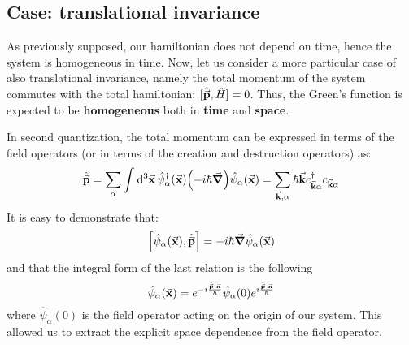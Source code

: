 \documentclass[../main/main.tex]{subfiles}
\begin{document}

\subsection{Case: translational invariance}
As previously supposed, our hamiltonian does not depend on time, hence the system is homogeneous in time.
Now, let us consider a more particular case of also translational invariance,   namely the total momentum of the system commutes with the total hamiltonian: \( [\hat{\va{p}}, \hat{H}  ] = 0 \).
Thus, the Green's function is expected to be \textbf{homogeneous} both in \textbf{time} and \textbf{space}.

In second quantization, the total momentum can be expressed in terms of the field operators (or in terms of the creation and destruction operators) as:
\begin{equation*}
  \hat{\va{p}} = \sum_{\alpha }^{} \int_{}^{} \dd[3]{\va{x}}
  \hat{\psi }_ \alpha ^\dag (\va{x}) \qty(- i \hbar \va{\grad }) \hat{\psi }_ \alpha (\va{x})
  = \sum_{\va{k}, \alpha }^{} \hbar \va{k} c_{\va{k} \alpha } ^\dag c_{\va{k} \alpha }
\end{equation*}
It is easy to demonstrate that:
\begin{equation*}
  \qty[ \hat{\psi }_ \alpha (\va{x}), \hat{\va{p}}  ]
  = - i \hbar \va{\grad } \hat{\psi }_ \alpha (\va{x})
\end{equation*}
and that the integral form of the last relation is the following
\begin{equation*}
  \hat{\psi }_ \alpha (\va{x}) = e^{-i \frac{\hat{\va{p}} \vdot \va{x}}{\hbar }}
  \hat{\psi }_ \alpha (0)   e^{i \frac{\hat{\va{p}} \vdot \va{x}}{\hbar }}
\end{equation*}
where \( \hat{\psi }_ \alpha (0)  \) is the field operator acting on the origin of our system. This allowed us to extract the explicit space dependence from the field operator.
\end{document}
